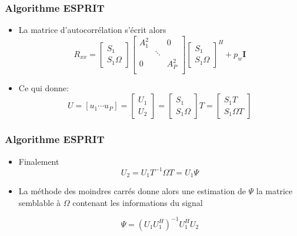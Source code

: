 \documentclass[10pt]{beamer}
\begin{document}
    
    \begin{frame}
        \frametitle{Algorithme ESPRIT}
         \begin{itemize}

        \item La matrice d'autocorrélation s'écrit alors 
\begin{equation}
R_{xx} = \begin{bmatrix} S_1 \\ S_1 \Omega \end{bmatrix} 
\begin{bmatrix} A_1^2 & & \text{0}\\ &  \ddots \\ \text{0} & & A_P^2 \\ \end{bmatrix}
\begin{bmatrix}   S_1 \\ S_1 \Omega \end{bmatrix}^H  + p_w\boldsymbol{I}
\end{equation}

        \item Ce qui donne:
        \begin{equation}
U = [u_1 \cdots u_P] = \begin{bmatrix} U_1 \\ U_2 \end{bmatrix} = \begin{bmatrix} S_1 \\ S_1 \Omega \end{bmatrix} T = \begin{bmatrix} S_1 T \\ S_1 \Omega T \end{bmatrix}
\end{equation}
\end{itemize}

    \end{frame}
    
    
    \begin{frame}
        \frametitle{Algorithme ESPRIT}
         \begin{itemize}

\item Finalement 
\begin{equation}
U_2 = U_1 T^{-1} \Omega T = U_1 \Psi
\end{equation}

\item La méthode des moindres carrés donne alors une estimation de \( \Psi\) la matrice semblable à \( \Omega\) contenant les informations du signal

\begin{equation}
\Psi = (U_1 U_1^H)^{-1} U_1^H U_2
\end{equation}
      
\end{itemize}

    \end{frame}
    
\end{document}
